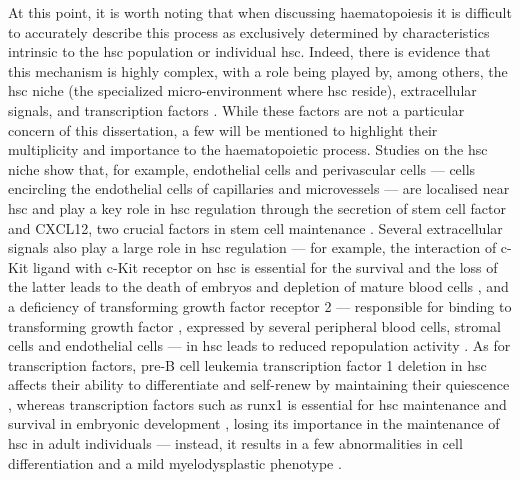 At this point, it is worth noting that when discussing haematopoiesis it is difficult to accurately describe this process as exclusively determined by characteristics intrinsic to the \ac{hsc} population or individual \ac{hsc}. Indeed, there is evidence that this mechanism is highly complex, with a role being played by, among others, the \ac{hsc} niche (the specialized micro-environment where \ac{hsc} reside), extracellular signals, and transcription factors \cite{Wang2016-oq}. While these factors are not a particular concern of this dissertation, a few will be mentioned to highlight their multiplicity and importance to the haematopoietic process. Studies on the \ac{hsc} niche show that, for example, endothelial cells and perivascular cells --- cells encircling the endothelial cells of capillaries and microvessels \cite{Crisan2012-nl} --- are localised near \ac{hsc} \cite{Ding2012-hv,Zhou2014-fd} and play a key role in \ac{hsc} regulation through the secretion of stem cell factor and CXCL12, two crucial factors in stem cell maintenance \cite{Ding2012-hv,Sugiyama2006-vc,Greenbaum2013-rx}. Several extracellular signals also play a large role in \ac{hsc} regulation --- for example, the interaction of c-Kit ligand with c-Kit receptor on \ac{hsc} is essential for the survival and the loss of the latter leads to the death of embryos and depletion of mature blood cells \cite{Huang1990-in}, and a deficiency of transforming growth factor \Beta{} receptor 2 --- responsible for binding to transforming growth factor , expressed by several peripheral blood cells, stromal cells and endothelial cells \cite{Zhao2014-dv} --- in \ac{hsc} leads to reduced repopulation activity \cite{Yamazaki2011-yv}. As for transcription factors, pre-B cell leukemia transcription factor 1 deletion in \ac{hsc} affects their ability to differentiate and self-renew by maintaining their quiescence \cite{Ficara2008-so}, whereas transcription factors such as \ac{runx1} is essential for \ac{hsc} maintenance and survival in embryonic development \cite{Okuda1996-rd}, losing its importance in the maintenance of \ac{hsc} in adult individuals \cite{Ichikawa2004-ow} --- instead, it results in a few abnormalities in cell differentiation and a mild myelodysplastic phenotype \cite{Ichikawa2004-ow,Growney2005-zx}.
